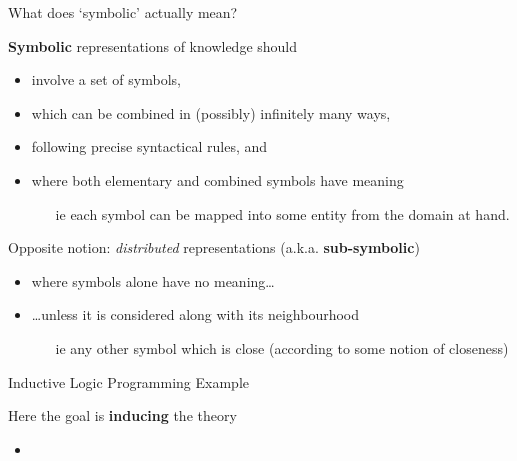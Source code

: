 \documentclass[presentation]{beamer}\mode<presentation>{\usetheme{AMSBolognaFC}}
\begin{document}
\begin{frame}[noframenumbering]{What does `symbolic' actually mean?}
    \begin{block}{\textbf{Symbolic} representations of knowledge should}
        \begin{itemize}
            \item involve a \alert{set of symbols},
            \item which can be combined in (possibly) \alert{infinitely many} ways, 
            \item following precise \alert{syntactical} rules, and
            \item where both elementary and combined symbols have \alert{meaning}
            \begin{itemize}
                \item[ie] \alert{each} symbol can be mapped into some entity from the domain at hand.
            \end{itemize}
        \end{itemize}
    \end{block}

    \begin{alertblock}{Opposite notion: \textit{distributed} representations (a.k.a. \textbf{sub-symbolic})}
        \begin{itemize}
            \item where symbols \alert{alone} have no meaning\ldots
            \item \ldots unless it is considered along with its \alert{neighbourhood}
            \begin{itemize}
                \item[ie] any other symbol which is \alert{close} (according to some notion of closeness)
            \end{itemize}
        \end{itemize}
    \end{alertblock}
\end{frame}

\begin{frame}{Inductive Logic Programming Example}
    \begin{exampleblock}{Here the goal is \textbf{inducing} the theory}
        \begin{itemize}
            \item {}
        \end{itemize}
    \end{exampleblock}
\end{frame}
\end{document}
